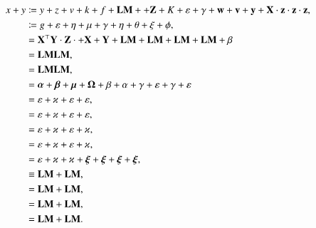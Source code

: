 \documentclass[10pt, reqno]{amsart}
\begin{document}
	
	\begin{align*}
	  x+y&\coloneqq y+z+v+k+f+\mathbf L\mathbf M++\mathbf Z+K+\varepsilon+\gamma+{\mathbf w}+{\mathbf v}+{\mathbf y}+\mathbf X\cdot{\mathbf z}\cdot{\mathbf z}\cdot{\mathbf z},\\
	  &\coloneqq g+\varepsilon+ \eta+\mu + \gamma+\eta + \theta + \xi + \phi,\\
	  &=\mathbf X^\top\mathbf Y\cdot \mathbf Z\cdot + \mathbf X+\mathbf Y +  \mathbf L\mathbf M +  \mathbf L\mathbf M +  \mathbf L\mathbf M +  \mathbf L\mathbf M + \beta\\
	  &= \mathbf L\mathbf M\mathbf L\mathbf M,\\
	  &= \mathbf L\mathbf M \mathbf L\mathbf M,\\
	  &={\boldsymbol \alpha}+{\boldsymbol \beta}+{\boldsymbol \mu}+{\boldsymbol \Omega}+\beta+\alpha+\gamma+\varepsilon+\gamma+\varepsilon\\
	  & = \varepsilon+\varkappa+\varepsilon+\varepsilon,\\
	  & = \varepsilon+\varkappa+\varepsilon+\varepsilon,\\
	  & = \varepsilon+\varkappa + \varepsilon+\varkappa,\\
	  & = \varepsilon+\varkappa + \varepsilon+\varkappa,\\
	  & = \varepsilon+\varkappa+\varkappa + {\boldsymbol \xi} + {\boldsymbol \xi}  + {\boldsymbol \xi} + {\boldsymbol \xi},\\
	  &\equiv \mathbf L\mathbf M +\mathbf L\mathbf M,\\
	  &= \mathbf L\mathbf M +\mathbf L\mathbf M,\\
	  &= \mathbf L\mathbf M +\mathbf L\mathbf M,\\
      &= \mathbf L\mathbf M +\mathbf L\mathbf M.\\
	\end{align*}



%
%
 
\end{document}
